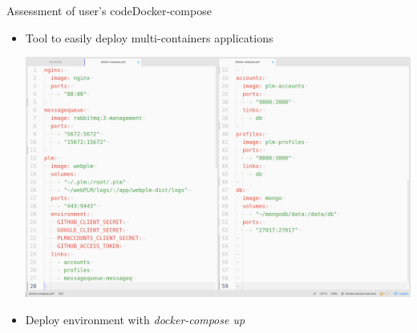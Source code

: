 \documentclass{beamer}
\begin{document}
\begin{frame}{Assessment of user's code}{Docker-compose}
  \begin{itemize}
  \item {
    Tool to easily deploy multi-containers applications
  }
  \begin{center}
    \includegraphics[scale=0.14]{img/docker-compose-white.png}
  \end{center}
  \item {
    Deploy environment with \emph{docker-compose up}
  }
  \end{itemize}
\end{frame}

{ %
  \begin{frame}[plain]
  \end{frame}
}
\end{document}
